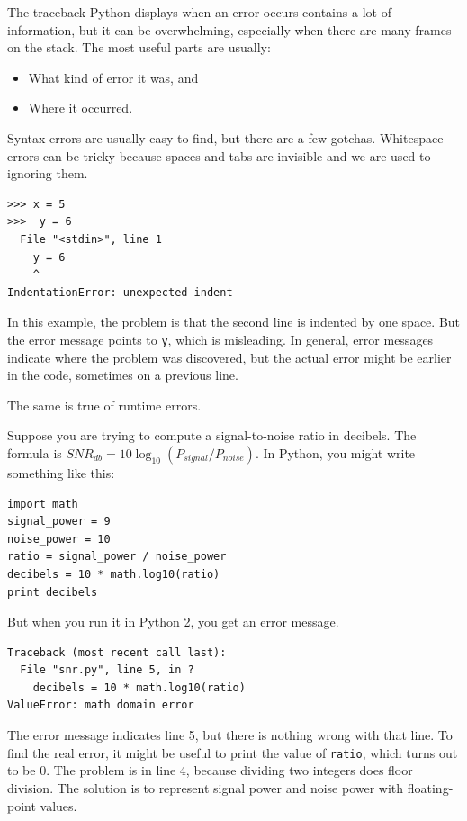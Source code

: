 \documentclass[10pt]{book}
\begin{document}
The traceback Python displays when an error occurs contains
a lot of information, but it can be overwhelming, especially
when there are many frames on the stack.  The most
useful parts are usually:

\begin{itemize}

\item What kind of error it was, and

\item Where it occurred.

\end{itemize}

Syntax errors are usually easy to find, but there are a few
gotchas.  Whitespace errors can be tricky because spaces and
tabs are invisible and we are used to ignoring them.

\begin{verbatim}
>>> x = 5
>>>  y = 6
  File "<stdin>", line 1
    y = 6
    ^
IndentationError: unexpected indent
\end{verbatim}
%
In this example, the problem is that the second line is indented by
one space.  But the error message points to {\tt y}, which is
misleading.  In general, error messages indicate where the problem was
discovered, but the actual error might be earlier in the code,
sometimes on a previous line.

The same is true of runtime errors.  

Suppose you are trying
to compute a signal-to-noise ratio in decibels.  The formula
is $SNR_{db} = 10 \log_{10} (P_{signal} / P_{noise})$.  In Python,
you might write something like this:

\begin{verbatim}
import math
signal_power = 9
noise_power = 10
ratio = signal_power / noise_power
decibels = 10 * math.log10(ratio)
print decibels
\end{verbatim}
%
But when you run it in Python 2, you get an error message.

\begin{verbatim}
Traceback (most recent call last):
  File "snr.py", line 5, in ?
    decibels = 10 * math.log10(ratio)
ValueError: math domain error
\end{verbatim}
%
The error message indicates line 5, but there is nothing
wrong with that line.  To find the real error, it might be
useful to print the value of {\tt ratio}, which turns out to
be 0.  The problem is in line 4, because dividing two integers
does floor division.  The solution is to represent signal power
and noise power with floating-point values.
\end{document}
